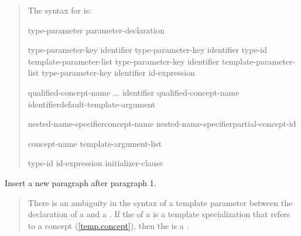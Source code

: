 \begin{quote}
\pnum
The syntax for  is:

\begin{bnf}
\br
  type-parameter\br
  parameter-declaration\br
\end{bnf}

\begin{bnf}
\br
  type-parameter-key \opt identifier\opt\br
  type-parameter-key identifier\opt{} \terminal{=} type-id\br
   template-parameter-list \terminal{>} type-parameter-key \opt identifier\opt\br
   template-parameter-list \terminal{>} type-parameter-key identifier\opt{} \terminal{=} id-expression
\end{bnf}

\begin{bnf}
\br
  \br
\end{bnf}

\begin{bnf}
\begin{addedblock}
\br
  qualified-concept-name ... identifier\opt\br
  qualified-concept-name identifier\opt default-template-argument\opt

\br
	nested-name-specifier\opt concept-name\br
	nested-name-specifier\opt partial-concept-id

\br
		concept-name \terminal{<} template-argument-list\opt \terminal{>}

\br
  \terminal{=} type-id\br
  \terminal{=} id-expression\br
  \terminal{=} initializer-clause
\end{addedblock}
\end{bnf}
\end{quote}

Insert a new paragraph after paragraph 1.

\begin{quote}
\begin{addedblock}
\pnum
There is an ambiguity in the syntax of a template parameter between the
declaration of a  and a
.
% 
If the  of a 
is a template specialization that refers to a 
concept (\ref{temp.concept}), 
then the  is a 
.
\end{addedblock}
\end{quote}

